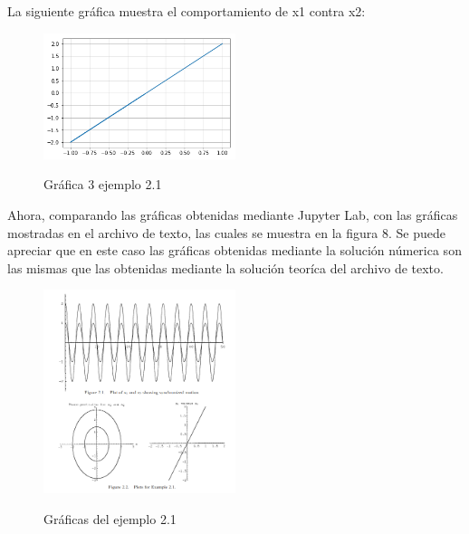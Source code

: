 \documentclass{article}
\begin{document}
La siguiente gráfica muestra el comportamiento de x1 contra x2:
\begin{figure}[H]
    \caption{Gráfica 3 ejemplo 2.1}
    \includegraphics[width=0.5\textwidth]{Grafica3.png}
    \centering
    \label{Cod}
\end{figure}
Ahora, comparando las gráficas obtenidas mediante Jupyter Lab, con las gráficas mostradas en el archivo de texto, las cuales se muestra en la figura 8.
Se puede apreciar que en este caso las gráficas obtenidas mediante la solución númerica son las mismas que las obtenidas mediante la solución teoríca del archivo de texto.
\begin{figure}[H]
    \caption{Gráficas del ejemplo 2.1}
    \includegraphics[width=0.5\textwidth]{Ejemplo1.PNG}
    \centering
    \label{Cod}
\end{figure}
\end{document}
